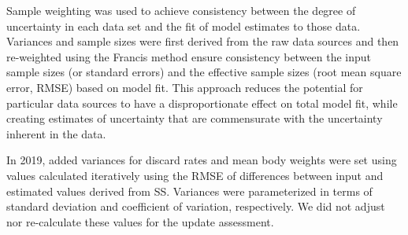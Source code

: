 \documentclass[11pt,
  english,
  a4paper,
]{article}
\begin{document}
\leavevmode\tagmcend\tagstructend


Sample weighting was used to achieve consistency between the degree of uncertainty in each data set and the fit of model estimates to those data. Variances and sample sizes were first derived from the raw data sources and then re-weighted using the Francis method ensure consistency between the input sample sizes (or standard errors) and the effective sample sizes (root mean square error, RMSE) based on model fit. This approach reduces the potential for particular data sources to have a disproportionate effect on total model fit, while creating estimates of uncertainty that are commensurate with the uncertainty inherent in the data.

\leavevmode\tagmcend\tagstructend\par


In 2019, added variances for discard rates and mean body weights were set using values calculated iteratively using the RMSE of differences between input and estimated values derived from SS. Variances were parameterized in terms of standard deviation and coefficient of variation, respectively. We did not adjust nor re-calculate these values for the update assessment.

\leavevmode\tagmcend\tagstructend\par

\end{document}
